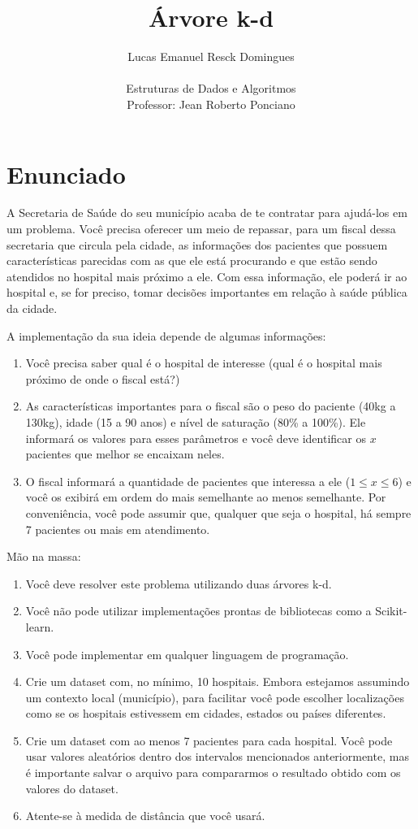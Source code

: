 \documentclass{article}
\title{Árvore k-d}
\author{Lucas Emanuel Resck Domingues \\ \\
Estruturas de Dados e Algoritmos \\
Professor: Jean Roberto Ponciano}
\begin{document}
    \maketitle

    \section{Enunciado}

    A Secretaria de Saúde do seu município acaba de te contratar para ajudá-los em um
    problema. Você precisa oferecer um meio de repassar, para um fiscal dessa secretaria que
    circula pela cidade, as informações dos pacientes que possuem características parecidas
    com as que ele está procurando e que estão sendo atendidos no hospital mais próximo a
    ele. Com essa informação, ele poderá ir ao hospital e, se for preciso, tomar decisões
    importantes em relação à saúde pública da cidade.
    
    A implementação da sua ideia depende de algumas informações:
    \begin{enumerate}
        \item Você precisa saber qual é o hospital de interesse (qual é o hospital mais próximo de onde o fiscal está?)
        \item As características importantes para o fiscal são o peso do paciente (40kg a 130kg), idade (15 a 90 anos) e nível de saturação (80\% a 100\%). Ele informará os valores para esses parâmetros e você deve identificar os $x$ pacientes que melhor se encaixam neles.
        \item O fiscal informará a quantidade de pacientes que interessa a ele ($1 \le x \le 6$) e você os exibirá em ordem do mais semelhante ao menos semelhante. Por conveniência, você pode assumir que, qualquer que seja o hospital, há sempre 7 pacientes ou mais em atendimento.
    \end{enumerate}

    Mão na massa:
    \begin{enumerate}
        \item Você deve resolver este problema utilizando duas árvores k-d.
        \item Você não pode utilizar implementações prontas de bibliotecas como a Scikit-learn.
        \item Você pode implementar em qualquer linguagem de programação.
        \item Crie um dataset com, no mínimo, 10 hospitais. Embora estejamos assumindo um     contexto local (município), para facilitar você pode escolher localizações como se os hospitais estivessem em cidades, estados ou países diferentes.
        \item Crie um dataset com ao menos 7 pacientes para cada hospital. Você pode usar valores aleatórios dentro dos intervalos mencionados anteriormente, mas é importante salvar o arquivo para compararmos o resultado obtido com os valores do dataset.
        \item Atente-se à medida de distância que você usará.
    \end{enumerate}
\end{document}
